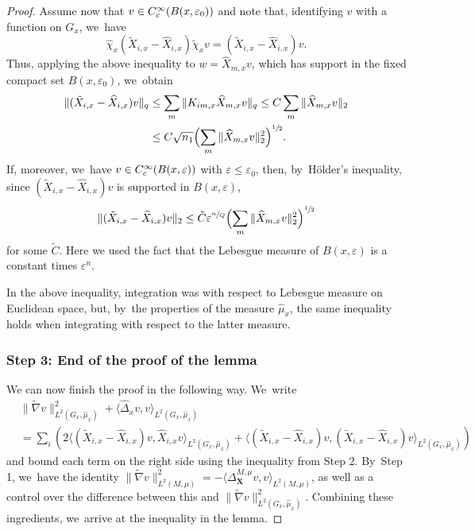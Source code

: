 \documentclass[11pt]{article}
\let\oldsfrac\sfrac
\renewcommand{\sfrac}[2]{{\oldsfrac{#1}{#2}}}
\newcommand{\rc}{\textup{c}}
\newcommand{\bX}{{\boldsymbol{X}}}
\theoremstyle{definition}
\let\epsilon\varepsilon
\let\Xb\bX
\newcommand{\1}{\mathbbm{1}}
\numberwithin{equation}{section}
\begin{document}
\begin{proof}
Assume now that $v\in C^\infty_\rc(B(x,\epsilon_0))$ and note that, identifying $v$ with a function on $G_x$, we~have
\[
\widehat \chi_x (\tilde X_{i,x} -\widehat X_{i,x}) \tilde\chi_x v
= (\tilde X_{i,x} -\widehat X_{i,x}) v.
\]
Thus, applying the above inequality to $w= \widehat X_{m,x} v$, which has support in the fixed compact set $B(x,\epsilon_0)$, we~obtain
\begin{align*}
\| (\tilde X_{i,x} -\widehat X_{i,x})v \|_q & \leq \sum_m \| K_{im,x} \widehat X_{m,x} v \|_q \leq C \sum_m \| \widehat X_{m,x} v \|_2 \\
& \leq C \sqrt{n_1} \Bigl(\sum_m \| \widehat X_{m,x} v \|_2^2 \Bigr)^{\sfrac12}.
\end{align*}
If, moreover, we~have $v\in C^\infty_\rc(B(x,\epsilon))$ with $\epsilon\leq\epsilon_0$, then, by~Hölder's inequality, since $(\tilde X_{i,x} -\widehat X_{i,x})v$ is supported in $B(x,\epsilon)$,
\[
\| (\tilde X_{i,x} -\widehat X_{i,x})v \|_2 \leq \tilde C \epsilon^{\sfrac n Q} \Bigl(\sum_m \| \widehat X_{m,x} v \|_2^2 \Bigr)^{\sfrac12}
\]
for some $\tilde C$. Here we used the fact that the Lebesgue measure of $B(x,\epsilon)$ is a constant times $\epsilon^n$.

In the above inequality, integration was with respect to Lebesgue measure on Euclidean space, but, by~the properties of the measure $\widehat\mu_x$, the same inequality holds when integrating with respect to the latter measure.

\subsubsection*{Step 3: End of the proof of the lemma}
We can now finish the proof in the following way. We~write
\begin{align*}
& \| \tilde \nabla v \|^2_{L^2(G_x,\widehat\mu_{x})} +
\langle \widehat \Delta_{x} v, v \rangle_{L^2(G_x,\widehat\mu_{x})} \\
& = \sum_i \! \left(2 \langle (\tilde X_{i,x}-\widehat X_{i,x}) v, \widehat X_{i,x} v \rangle_{L^2(G_x,\widehat\mu_{x})} \! + \! \langle (\tilde X_{i,x}-\widehat X_{i,x}) v, (\tilde X_{i,x}-\widehat X_{i,x}) v\rangle_{L^2(G_x,\widehat\mu_{x})}\right)
\end{align*}
and bound each term on the right side using the inequality from Step 2. By~Step 1, we~have the identity $\| \tilde \nabla v \|^2_{L^2(M,\mu)} = -\langle\Delta_\Xb^{M,\mu} v,v\rangle_{L^2(M,\mu)}$, as well as a control over the difference between this and $\| \tilde \nabla v \|^2_{L^2(G_x,\widehat\mu_{x})}$. Combining these ingredients, we~arrive at the inequality in the lemma.
\end{proof}
\end{document}
